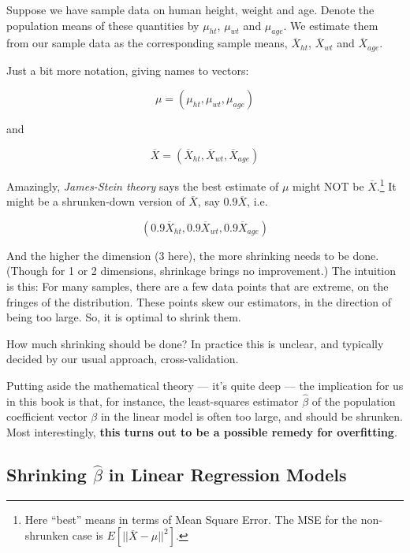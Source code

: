 Suppose we have sample data on human height, weight and age.  Denote the
population means of these quantities by $\mu_{ht}$, $\mu_{wt}$ and
$\mu_{age}$.  We estimate them from our sample data as the corresponding
sample means, $\overline{X}_{ht}$, $\overline{X}_{wt}$ and
$\overline{X}_{age}$.

Just a bit more notation, giving names to vectors:

\begin{equation}
\mu = (\mu_{ht},\mu_{wt}, \mu_{age})
\end{equation}

\noindent
and

\begin{equation}
\overline{X} = (\overline{X}_{ht},\overline{X}_{wt}, \overline{X}_{age})
\end{equation}

\noindent
Amazingly, \textit{James-Stein theory} says
the best estimate of $\mu$ might NOT be $\overline{X}$.\footnote{Here
``best'' means in terms of Mean Square Error.  The MSE for the
non-shrunken case is $E \left [||\overline{X} - \mu ||^2 \right ].$}  
It might be a shrunken-down version of $\overline{X}$, say $0.9
\overline{X}$, i.e.

\begin{equation}
(0.9 \overline{X}_{ht},0.9 \overline{X}_{wt}, 0.9 \overline{X}_{age})
\end{equation}

\noindent
And the higher the dimension (3 here), the more shrinking needs to be done.
(Though for 1 or 2 dimensions, shrinkage brings no improvement.)
The intuition is this:  For many samples, there are a few data points
that are extreme, on the fringes of the distribution.  These points skew
our estimators, in the direction of being too large.  So, it is optimal
to shrink them.

How much shrinking should be done?  In practice this is unclear, and
typically decided by our usual approach, cross-validation.

Putting aside the mathematical theory --- it's quite deep --- the
implication for us in this book is that, for instance, the least-squares
estimator $\widehat{\beta}$ of the population coefficient vector $\beta$
in the linear model is often too large, and should be shrunken.  Most
interestingly, \textbf{this turns out to be a possible remedy for
overfitting}.

\subsection{Shrinking $\widehat{\beta}$ in Linear Regression Models}

